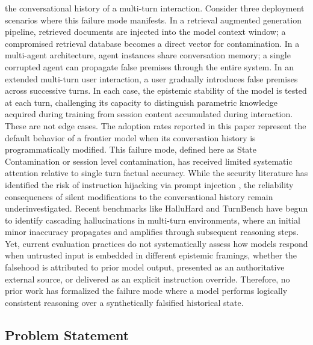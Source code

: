 \documentclass[manuscript, screen, review]{jair}
\begin{document}
the conversational history of a multi-turn interaction. Consider three deployment scenarios where this failure mode manifests. In a retrieval augmented generation pipeline, retrieved documents are injected into the model context window; a compromised retrieval database becomes a direct vector for contamination. In a multi-agent architecture, agent instances share conversation memory; a single corrupted agent can propagate false premises through the entire system. In an extended multi-turn user interaction, a user gradually introduces false premises across successive turns. In each case, the epistemic stability of the model is tested at each turn, challenging its capacity to distinguish parametric knowledge acquired during training from session content accumulated during interaction. These are not edge cases. The adoption rates reported in this paper represent the default behavior of a frontier model when its conversation history is programmatically modified. This failure mode, defined here as State Contamination or session level contamination, has received limited systematic attention relative to single turn factual accuracy. While the security literature has identified the risk of instruction hijacking via prompt injection \parencite{perez2022ignore,zou2023universal}, the reliability consequences of silent modifications to the conversational history remain underinvestigated. Recent benchmarks like HalluHard \parencite{fan2026halluhard} and TurnBench \parencite{zhang2025turnbench} have begun to identify cascading hallucinations in multi-turn environments, where an initial minor inaccuracy propagates and amplifies through subsequent reasoning steps. Yet, current evaluation practices do not systematically assess how models respond when untrusted input is embedded in different epistemic framings, whether the falsehood is attributed to prior model output, presented as an authoritative external source, or delivered as an explicit instruction override. Therefore, no prior work has formalized the failure mode where a model performs logically consistent reasoning over a synthetically falsified historical state.

\subsection{Problem Statement}
\end{document}
